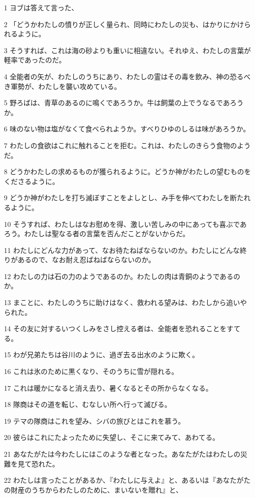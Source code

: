 \par 1 ヨブは答えて言った、
\par 2 「どうかわたしの憤りが正しく量られ、同時にわたしの災も、はかりにかけられるように。
\par 3 そうすれば、これは海の砂よりも重いに相違ない。それゆえ、わたしの言葉が軽率であったのだ。
\par 4 全能者の矢が、わたしのうちにあり、わたしの霊はその毒を飲み、神の恐るべき軍勢が、わたしを襲い攻めている。
\par 5 野ろばは、青草のあるのに鳴くであろうか。牛は飼葉の上でうなるであろうか。
\par 6 味のない物は塩がなくて食べられようか。すべりひゆのしるは味があろうか。
\par 7 わたしの食欲はこれに触れることを拒む。これは、わたしのきらう食物のようだ。
\par 8 どうかわたしの求めるものが獲られるように。どうか神がわたしの望むものをくださるように。
\par 9 どうか神がわたしを打ち滅ぼすことをよしとし、み手を伸べてわたしを断たれるように。
\par 10 そうすれば、わたしはなお慰めを得、激しい苦しみの中にあっても喜ぶであろう。わたしは聖なる者の言葉を否んだことがないからだ。
\par 11 わたしにどんな力があって、なお待たねばならないのか。わたしにどんな終りがあるので、なお耐え忍ばねばならないのか。
\par 12 わたしの力は石の力のようであるのか。わたしの肉は青銅のようであるのか。
\par 13 まことに、わたしのうちに助けはなく、救われる望みは、わたしから追いやられた。
\par 14 その友に対するいつくしみをさし控える者は、全能者を恐れることをすてる。
\par 15 わが兄弟たちは谷川のように、過ぎ去る出水のように欺く。
\par 16 これは氷のために黒くなり、そのうちに雪が隠れる。
\par 17 これは暖かになると消え去り、暑くなるとその所からなくなる。
\par 18 隊商はその道を転じ、むなしい所へ行って滅びる。
\par 19 テマの隊商はこれを望み、シバの旅びとはこれを慕う。
\par 20 彼らはこれにたよったために失望し、そこに来てみて、あわてる。
\par 21 あなたがたは今わたしにはこのような者となった。あなたがたはわたしの災難を見て恐れた。
\par 22 わたしは言ったことがあるか、『わたしに与えよ』と、あるいは『あなたがたの財産のうちからわたしのために、まいないを贈れ』と、
